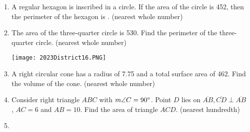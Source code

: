 \documentclass[../uilmath.tex]{subfiles}
\begin{document}
\begin{enumerate}[label=\bfseries\arabic*.]
    \item %
    A regular hexagon is inscribed in a circle. If the area of the circle is 452, then the perimeter of the hexagon is \blank. (nearest whole number)

    \item %
    The area of the three-quarter circle is 530. Find the perimeter of the three-quarter circle. (nearest whole number)
    \begin{center}
        \texttt{[image: 2023District16.PNG]}
    \end{center}

    \item %
    A right circular cone has a radius of 7.75 and a total surface area of 462. Find the volume of the cone. (nearest whole number)

    \item %
    Consider right triangle $ABC$ with $m\angle C = 90\degree$. Point $D$ lies on $\overline{AB}, \overline{CD}\perp \overline{AB}$, $AC=6$ and $AB=10$.
    Find the area of triangle $ACD$. (nearest hundredth)

    \item %
    

\end{enumerate}
\end{document}
